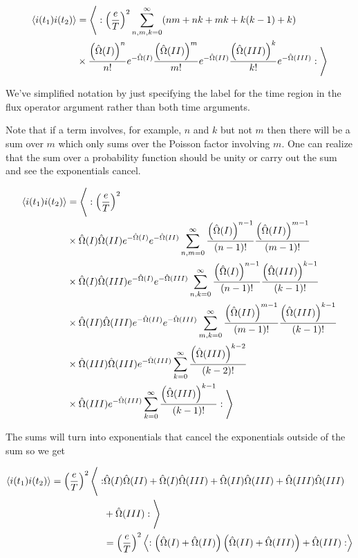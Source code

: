 \documentclass[12pt]{article}
\begin{document}
\begin{align}
\Braket{i(t_1)i(t_2)} &= \Bigg \langle: \left(\frac{e}{T}\right)^2 \sum_{n,m,k=0}^{\infty} (nm + nk + mk + k(k-1) + k)\\
&\times \frac{\left(\hat{\Omega}(I)\right)^n}{n!}e^{-\hat{\Omega}(I)} \frac{\left(\hat{\Omega}(II)\right)^m}{m!}e^{-\hat{\Omega}(II)} \frac{\left(\hat{\Omega}(III)\right)^k}{k!}e^{-\hat{\Omega}(III)} :\Bigg \rangle\\
\end{align}

We've simplified notation by just specifying the label for the time region in the flux operator argument rather than both time arguments.

Note that if a term involves, for example, $n$ and $k$ but not $m$ then there will be a sum over $m$ which only sums over the Poisson factor involving $m$. One can realize that the sum over a probability function should be unity or carry out the sum and see the exponentials cancel.

\begin{align}
\Braket{i(t_1)i(t_2)} &= \Bigg \langle: \left(\frac{e}{T}\right)^2 \\
&\times \hat{\Omega}(I)\hat{\Omega}(II) e^{-\hat{\Omega}(I)}e^{-\hat{\Omega}(II)}\sum_{n,m=0}^{\infty} \frac{\left(\hat{\Omega}(I)\right)^{n-1}}{(n-1)!}\frac{\left(\hat{\Omega}(II)\right)^{m-1}}{(m-1)!}\\
&\times \hat{\Omega}(I)\hat{\Omega}(III) e^{-\hat{\Omega}(I)}e^{-\hat{\Omega}(III)}\sum_{n,k=0}^{\infty} \frac{\left(\hat{\Omega}(I)\right)^{n-1}}{(n-1)!}\frac{\left(\hat{\Omega}(III)\right)^{k-1}}{(k-1)!}\\
&\times \hat{\Omega}(II)\hat{\Omega}(III) e^{-\hat{\Omega}(II)}e^{-\hat{\Omega}(III)}\sum_{m,k=0}^{\infty} \frac{\left(\hat{\Omega}(II)\right)^{m-1}}{(m-1)!}\frac{\left(\hat{\Omega}(III)\right)^{k-1}}{(k-1)!}\\
&\times \hat{\Omega}(III)\hat{\Omega}(III) e^{-\hat{\Omega}(III)}\sum_{k=0}^{\infty} \frac{\left(\hat{\Omega}(III)\right)^{k-2}}{(k-2)!}\\
&\times \hat{\Omega}(III) e^{-\hat{\Omega}(III)}\sum_{k=0}^{\infty} \frac{\left(\hat{\Omega}(III)\right)^{k-1}}{(k-1)!} : \Bigg \rangle
\end{align}

The sums will turn into exponentials that cancel the exponentials outside of the sum so we get

\begin{align}
\Braket{i(t_1)i(t_2)} = \left( \frac{e}{T} \right)^2 \Bigg \langle:&\hat{\Omega}(I)\hat{\Omega}(II)  + \hat{\Omega}(I)\hat{\Omega}(III)  + \hat{\Omega}(II)\hat{\Omega}(III)  + \hat{\Omega}(III)\hat{\Omega}(III)\\
& + \hat{\Omega}(III)  :\Bigg \rangle\\
&= \left(\frac{e}{T} \right)^2 \Braket{:\left(\hat{\Omega}(I)+\hat{\Omega}(II)\right)\left(\hat{\Omega}(II)+\hat{\Omega}(III) \right) + \hat{\Omega}(III):}
\end{align}
\end{document}
